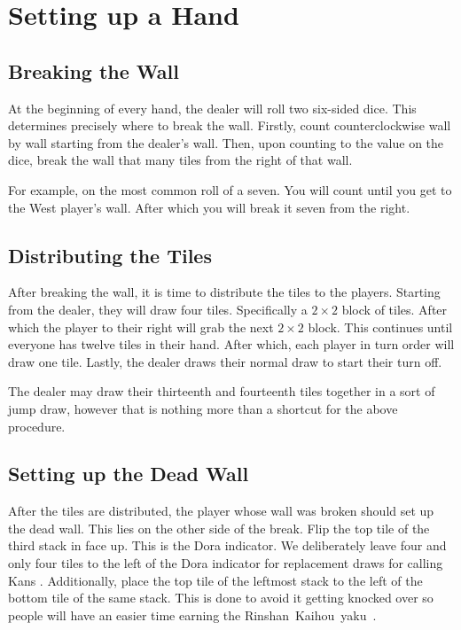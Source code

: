 \section{Setting up a Hand}\label{core:sec:hand}

\subsection{Breaking the Wall}

At the beginning of every hand, the dealer will roll two six-sided dice. This determines precisely where to break the wall. Firstly, count counterclockwise wall by wall starting from the dealer's wall. Then, upon counting to the value on the dice, break the wall that many tiles from the right of that wall.

For example, on the most common roll of a seven. You will count until you get to the West player's wall. After which you will break it seven from the right.

\subsection{Distributing the Tiles}

After breaking the wall, it is time to distribute the tiles to the players. Starting from the dealer, they will draw four tiles. Specifically a \(2 \times 2\) block of tiles. After which the player to their right will grab the next \(2 \times 2\) block. This continues until everyone has twelve tiles in their hand. After which, each player in turn order will draw one tile. Lastly, the dealer draws their normal draw to start their turn off.

The dealer may draw their thirteenth and fourteenth tiles together in a sort of jump draw, however that is nothing more than a shortcut for the above procedure.

\subsection{Setting up the Dead Wall}

After the tiles are distributed, the player whose wall was broken should set up the dead wall. This lies on the other side of the break. Flip the top tile of the third stack in face up. This is the Dora indicator. We deliberately leave four and only four tiles to the left of the Dora indicator for replacement draws for calling Kans . Additionally, place the top tile of the leftmost stack to the left of the bottom tile of the same stack. This is done to avoid it getting knocked over so people will have an easier time earning the Rinshan~Kaihou~yaku~.